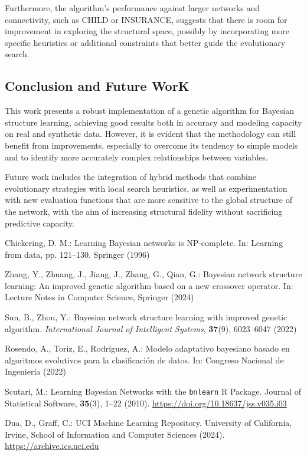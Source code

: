 \documentclass[runningheads]{llncs}
\begin{document}
Furthermore, the algorithm's performance against larger networks and connectivity, such as CHILD or INSURANCE, suggests that there is room for improvement in exploring the structural space, possibly by incorporating more specific heuristics or additional constraints that better guide the evolutionary search.

\subsection{Conclusion and Future WorK}

This work presents a robust implementation of a genetic algorithm for Bayesian structure learning, achieving good results both in accuracy and modeling capacity on real and synthetic data. However, it is evident that the methodology can still benefit from improvements, especially to overcome its tendency to simple models and to identify more accurately complex relationships between variables.

Future work includes the integration of hybrid methods that combine evolutionary strategies with local search heuristics, as well as experimentation with new evaluation functions that are more sensitive to the global structure of the network, with the aim of increasing structural fidelity without sacrificing predictive capacity.

%
%
%
% 
% 
%

\begin{thebibliography}{9}
	Chickering, D. M.: Learning Bayesian networks is NP-complete. In: Learning from data, pp. 121–130. Springer (1996)
	
	Zhang, Y., Zhuang, J., Jiang, J., Zhang, G., Qian, G.: Bayesian network structure learning: An improved genetic algorithm based on a new crossover operator. In: Lecture Notes in Computer Science, Springer (2024)
	
	Sun, B., Zhou, Y.: Bayesian network structure learning with improved genetic algorithm. \textit{International Journal of Intelligent Systems}, \textbf{37}(9), 6023--6047 (2022)
	
	Rosendo, A., Toriz, E., Rodríguez, A.: Modelo adaptativo bayesiano basado en algoritmos evolutivos para la clasificación de datos. In: Congreso Nacional de Ingeniería (2022)
	
	Scutari, M.: Learning Bayesian Networks with the \texttt{bnlearn} R Package. Journal of Statistical Software, \textbf{35}(3), 1--22 (2010). \url{https://doi.org/10.18637/jss.v035.i03}
	
	Dua, D., Graff, C.: UCI Machine Learning Repository. University of California, Irvine, School of Information and Computer Sciences (2024). \url{https://archive.ics.uci.edu}
	
	
\end{thebibliography}
\end{document}
